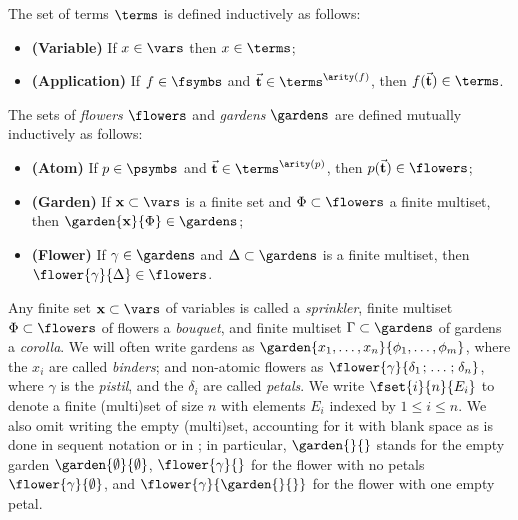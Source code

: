 \begin{definition}[Terms]
  The set of terms $\terms$ is defined inductively as follows:
  \begin{itemize}
    \item{\textbf{(Variable)}} If $x \in \vars$ then $x \in \terms$;
    \item{\textbf{(Application)}} If $f \in \fsymbs$ and $\tvec{t}
    \in \terms^{\arity(f)}$, then $f(\tvec{t}) \in \terms$.
  \end{itemize}
\end{definition}

\begin{definition}[Flowers]
  The sets of \emph{flowers} $\flowers$ and \emph{gardens} $\gardens$ are
  defined mutually inductively as follows:
  \begin{itemize}
    \item{\textbf{(Atom)}} If $p \in \psymbs$ and $\tvec{t} \in
    \terms^{\arity(p)}$, then $p(\tvec{t}) \in \flowers$;
    \item{\textbf{(Garden)}} If $\bx \subset \vars$ is a finite set and $\Phi
    \subset \flowers$ a finite multiset, then $\garden{\bx}{\Phi} \in
    \gardens$;
    \item{\textbf{(Flower)}} If $\gamma \in \gardens$ and $\Delta \subset \gardens$
    is a finite multiset, then $\flower{\gamma}{\Delta} \in \flowers$.
  \end{itemize}
\end{definition}

Any finite set $\bx \subset \vars$ of variables is called a \emph{sprinkler},
finite multiset $\Phi \subset \flowers$ of flowers a \emph{bouquet}, and finite
multiset $\Gamma \subset \gardens$ of gardens a \emph{corolla}. We will often
write gardens as $\garden{x_1, \ldots, x_n}{\phi_1, \ldots, \phi_m}$, where the
$x_i$ are called \emph{binders}; and non-atomic flowers as
$\flower{\gamma}{\delta_1 \sep \ldots \sep \delta_n}$, where $\gamma$ is the
\emph{pistil}, and the $\delta_i$ are called \emph{petals}. We write
$\fset{i}{n}{E_i}$ to denote a finite (multi)set of size $n$ with elements $E_i$
indexed by $1 \leq i \leq n$. We also omit writing the empty (multi)set,
accounting for it with blank space as is done in sequent notation or in ; in
particular, $\garden{{}}{{}}$ stands for the empty garden
$\garden{\emptyset}{\emptyset}$, $\flower{\gamma}{{}}$ for the flower with no
petals $\flower{\gamma}{\emptyset}$, and $\flower{\gamma}{\garden{{}}{{}}}$ for
the flower with one empty petal.

